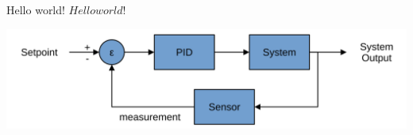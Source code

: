 \documentclass[12pt]{article}
\begin{document}
	Hello world!
	$Hello world!$ %
	
	\includegraphics{PID.svg}
\end{document}
